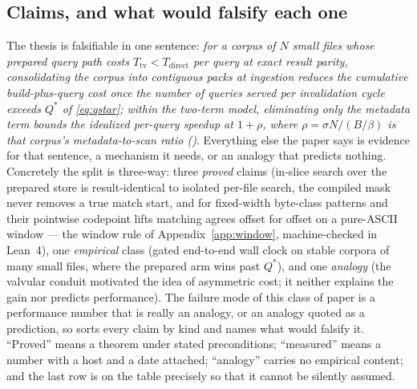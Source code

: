 \documentclass[11pt,letterpaper]{article}
\begin{document}
\subsection{Claims, and what would falsify each one}
\label{sec:claims}
The thesis is falsifiable in one sentence: \emph{for a corpus of $N$ small
files whose prepared query path costs $T_{\text{tv}}<T_{\text{direct}}$ per
query at exact result parity, consolidating the corpus into contiguous packs
at ingestion reduces the cumulative build-plus-query cost once the number of
queries served per invalidation cycle exceeds $Q^{*}$ of \eqref{eq:qstar};
within the two-term model, eliminating only the metadata term bounds the
idealized per-query speedup at $1+\rho$, where $\rho=\sigma N/(B/\beta)$ is
that corpus's metadata-to-scan ratio ()}. Everything else the paper says is evidence for
that sentence, a mechanism it needs, or an analogy that predicts nothing.
Concretely the split is three-way: three \emph{proved} claims (in-slice
search over the prepared store is result-identical to isolated per-file
search, the compiled mask never removes a true match start, and for
fixed-width byte-class patterns and their pointwise codepoint lifts matching
agrees offset for offset on a pure-ASCII window --- the
window rule of Appendix~\ref{app:window}, machine-checked in Lean~4), one
\emph{empirical} class (gated end-to-end wall clock on stable corpora of
many small files, where the prepared arm wins past $Q^{*}$), and one
\emph{analogy} (the valvular conduit motivated the idea of asymmetric
cost; it neither explains the gain nor predicts performance).
The failure mode of this class of paper is a performance number that is
really an analogy, or an analogy quoted as a prediction, so
 sorts every claim by kind and names what would falsify
it. ``Proved'' means a theorem under stated preconditions;
``measured'' means a number with a host and a date attached;
``analogy'' carries no empirical content; and the last row is on the
table precisely so that it cannot be silently assumed.
\end{document}
